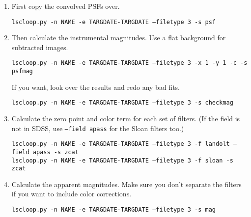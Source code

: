 \begin{enumerate}

\item First copy the convolved PSFs over.

{\tt lscloop.py -n NAME -e TARGDATE-TARGDATE --filetype 3 -s psf}

\item Then calculate the instrumental magnitudes. Use a flat background for subtracted images.

{\tt lscloop.py -n NAME -e TARGDATE-TARGDATE --filetype 3 -x 1 -y 1 -c -s psfmag }

If you want, look over the results and redo any bad fits.

{\tt lscloop.py -n NAME -e TARGDATE-TARGDATE --filetype 3 -s checkmag}

\item Calculate the zero point and color term for each set of filters. (If the field is not in SDSS, use {\tt --field apass} for the Sloan filters too.)

{\tt lscloop.py -n NAME -e TARGDATE-TARGDATE --filetype 3 -f landolt --field apass -s zcat }\\
{\tt lscloop.py -n NAME -e TARGDATE-TARGDATE --filetype 3 -f sloan -s zcat }

\item Calculate the apparent magnitudes. Make sure you don't separate the filters if you want to include color corrections.

{\tt lscloop.py -n NAME -e TARGDATE-TARGDATE --filetype 3 -s mag }

\end{enumerate}